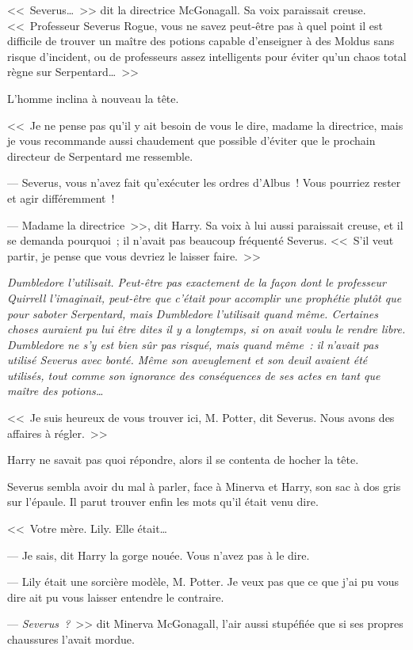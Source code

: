 <<~Severus…~>> dit la directrice McGonagall. Sa voix paraissait creuse. <<~Professeur Severus Rogue, vous ne savez peut-être pas à quel point il est difficile de trouver un maître des potions capable d'enseigner à des Moldus sans risque d'incident, ou de professeurs assez intelligents pour éviter qu'un chaos total règne sur Serpentard…~>>

L'homme inclina à nouveau la tête.

<<~Je ne pense pas qu'il y ait besoin de vous le dire, madame la directrice, mais je vous recommande aussi chaudement que possible d'éviter que le prochain directeur de Serpentard me ressemble.

--- Severus, vous n'avez fait qu'exécuter les ordres d'Albus~! Vous pourriez rester et agir différemment~!

--- Madame la directrice~>>, dit Harry. Sa voix à lui aussi paraissait creuse, et il se demanda pourquoi~; il n'avait pas beaucoup fréquenté Severus. <<~S'il veut partir, je pense que vous devriez le laisser faire.~>>

\emph{Dumbledore l'utilisait. Peut-être pas exactement de la façon dont le professeur Quirrell l'imaginait, peut-être que c'était pour accomplir une prophétie plutôt que pour saboter Serpentard, mais Dumbledore l'utilisait quand même. Certaines choses auraient pu lui être dites il y a longtemps, si on avait voulu le rendre libre. Dumbledore ne s'y est bien sûr pas risqué, mais quand même~: il n'avait pas utilisé Severus avec bonté. Même son aveuglement et son deuil avaient été utilisés, tout comme son ignorance des conséquences de ses actes en tant que maître des potions…}

<<~Je suis heureux de vous trouver ici, M. Potter, dit Severus. Nous avons des affaires à régler.~>>

Harry ne savait pas quoi répondre, alors il se contenta de hocher la tête.

Severus sembla avoir du mal à parler, face à Minerva et Harry, son sac à dos gris sur l'épaule. Il parut trouver enfin les mots qu'il était venu dire.

<<~Votre mère. Lily. Elle était…

--- Je sais, dit Harry la gorge nouée. Vous n'avez pas à le dire.

--- Lily était une sorcière modèle, M. Potter. Je veux pas que ce que j'ai pu vous dire ait pu vous laisser entendre le contraire.

--- \emph{Severus~?}~>> dit Minerva McGonagall, l'air aussi stupéfiée que si ses propres chaussures l'avait mordue.

